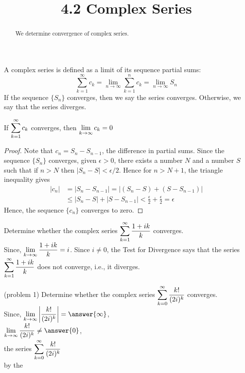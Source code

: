 \documentclass[handout]{ximera}
\title{4.2 Complex Series}
\begin{document}
\begin{abstract}
We determine convergence of complex series.
\end{abstract}

\maketitle


\begin{definition} 
A complex series  is defined as a limit of its sequence partial sums:
\[
\sum_{k=1}^\infty c_k = \lim_{n \to \infty}  \sum_{k=1}^n c_k = \lim_{n \to \infty} S_n
\]
If the sequence $\{S_n\}$ converges, then we say the series converges.  Otherwise, we say that the series diverges. 
\end{definition}

\begin{theorem}
If $\displaystyle \sum_{k=1}^\infty c_k$ converges, then $\displaystyle \lim_{k\to\infty} c_k = 0$
\end{theorem}
\begin{proof}
Note that $c_n = S_n - S_{n-1}$, the difference in partial sums. Since the sequence $\{S_n\}$ converges, given $\epsilon >0$,
there exists a number $N$ and a number $S$ such that if $n>N$ then $|S_n - S| < \epsilon/2$. Hence for $n > N+1$, the triangle inequality gives
\begin{align*}
|c_n| &= |S_n - S_{n-1}| = |(S_n -S) + (S-S_{n-1})| \\
&\leq |S_n -S| + |S-S_{n-1}| < \frac{\epsilon}{2} + \frac{\epsilon}{2} =\epsilon
\end{align*}
Hence, the sequence $\{c_n\}$ converges to zero.
\end{proof}


\begin{example}[example 1] 
Determine whether the complex series $\displaystyle \sum_{k=1}^\infty \frac{1+ik}{k}$ converges.\\
Since, $\displaystyle \lim_{k \to \infty} \frac{1+ik}{k} = i$. Since $i \neq 0$, the Test for Divergence says that the series $\displaystyle \sum_{k=1}^\infty \frac{1+ik}{k}$
does not converge, i.e., it diverges.
\end{example}

\begin{problem}(problem 1) 
Determine whether the complex series $\displaystyle \sum_{k=0}^\infty \frac{k!}{(2i)^k}$ converges.\\
Since, $\dis \lim_{k \to \infty} \left|\frac{k!}{(2i)^k}\right| = \answer{\infty}$,\\
 $\dis \lim_{k \to \infty} \frac{k!}{(2i)^k} \neq \answer{0}$,\\
 the series $\displaystyle \sum_{k=0}^\infty \frac{k!}{(2i)^k}\;\;$ \\
 by the 
\end{problem}
\end{document}

